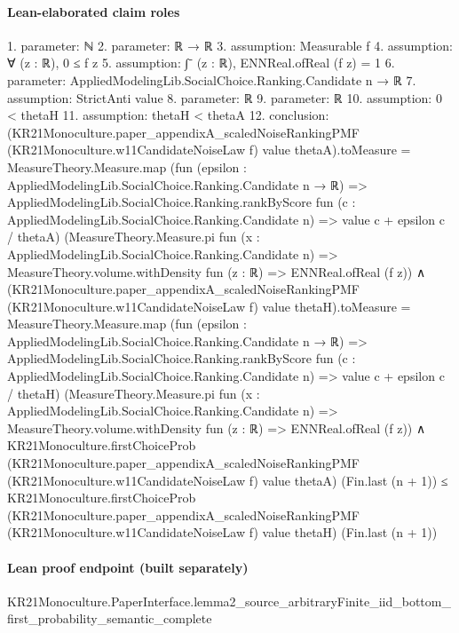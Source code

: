 \documentclass[10pt]{article}
\begin{document}
\paragraph{Lean-elaborated claim roles}\begin{ReviewVerbatim}
1. parameter: ℕ
2. parameter: ℝ → ℝ
3. assumption: Measurable f
4. assumption: ∀ (z : ℝ), 0 ≤ f z
5. assumption: ∫⁻ (z : ℝ), ENNReal.ofReal (f z) = 1
6. parameter: AppliedModelingLib.SocialChoice.Ranking.Candidate n → ℝ
7. assumption: StrictAnti value
8. parameter: ℝ
9. parameter: ℝ
10. assumption: 0 < thetaH
11. assumption: thetaH < thetaA
12. conclusion: (KR21Monoculture.paper_appendixA_scaledNoiseRankingPMF (KR21Monoculture.w11CandidateNoiseLaw f) value
        thetaA).toMeasure =
    MeasureTheory.Measure.map
      (fun (epsilon : AppliedModelingLib.SocialChoice.Ranking.Candidate n → ℝ) =>
        AppliedModelingLib.SocialChoice.Ranking.rankByScore
          fun (c : AppliedModelingLib.SocialChoice.Ranking.Candidate n) => value c + epsilon c / thetaA)
      (MeasureTheory.Measure.pi fun (x : AppliedModelingLib.SocialChoice.Ranking.Candidate n) =>
        MeasureTheory.volume.withDensity fun (z : ℝ) => ENNReal.ofReal (f z)) ∧
  (KR21Monoculture.paper_appendixA_scaledNoiseRankingPMF (KR21Monoculture.w11CandidateNoiseLaw f) value
          thetaH).toMeasure =
      MeasureTheory.Measure.map
        (fun (epsilon : AppliedModelingLib.SocialChoice.Ranking.Candidate n → ℝ) =>
          AppliedModelingLib.SocialChoice.Ranking.rankByScore
            fun (c : AppliedModelingLib.SocialChoice.Ranking.Candidate n) => value c + epsilon c / thetaH)
        (MeasureTheory.Measure.pi fun (x : AppliedModelingLib.SocialChoice.Ranking.Candidate n) =>
          MeasureTheory.volume.withDensity fun (z : ℝ) => ENNReal.ofReal (f z)) ∧
    KR21Monoculture.firstChoiceProb
        (KR21Monoculture.paper_appendixA_scaledNoiseRankingPMF (KR21Monoculture.w11CandidateNoiseLaw f) value thetaA)
        (Fin.last (n + 1)) ≤
      KR21Monoculture.firstChoiceProb
        (KR21Monoculture.paper_appendixA_scaledNoiseRankingPMF (KR21Monoculture.w11CandidateNoiseLaw f) value thetaH)
        (Fin.last (n + 1))
\end{ReviewVerbatim}

\paragraph{Lean proof endpoint (built separately)}\begin{ReviewVerbatim}
KR21Monoculture.PaperInterface.lemma2_source_arbitraryFinite_iid_bottom_first_probability_semantic_complete
\end{ReviewVerbatim}
\end{document}
